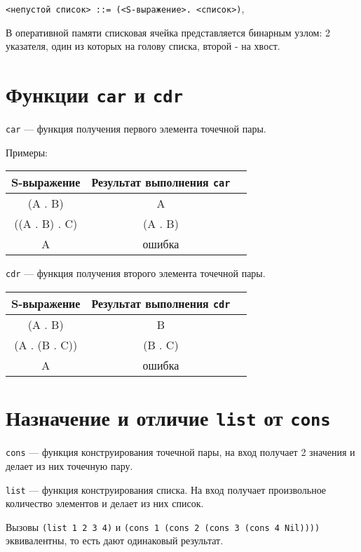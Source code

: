 \texttt{<непустой список> ::= (<S-выражение>. <список>)},

В оперативной памяти списковая ячейка представляется бинарным узлом: 2 указателя, один из которых на голову списка, второй - на хвост.


\section{Функции \texttt{car} и \texttt{cdr}}

\texttt{car} --- функция получения первого элемента точечной пары.

Примеры:

\begin{center}
    \begin{tabular}{ |c|c|c| } 
        \hline
            S-выражение & Результат выполнения \texttt{car} \\ 
        \hline
        \hline
            (A . B) & A \\ 
        \hline
            ((A . B) . C) & (A . B) \\ 
        \hline
            A & ошибка \\ 
        \hline
    \end{tabular}
\end{center}


\texttt{cdr} --- функция получения второго элемента точечной пары.

\begin{center}
    \begin{tabular}{ |c|c|c| } 
        \hline
            S-выражение & Результат выполнения \texttt{cdr} \\ 
        \hline
        \hline
            (A . B) & B \\ 
        \hline
            (A . (B . C)) & (B . C) \\ 
        \hline
            A & ошибка \\ 
        \hline
    \end{tabular}
\end{center}


\section{Назначение и отличие \texttt{list} от \texttt{cons}}

\texttt{cons} --- функция конструирования точечной пары, на вход получает 2 значения и делает из них точечную пару.

\texttt{list} --- функция конструирования списка. На вход получает произвольное количество элементов и делает из них список.

Вызовы \texttt{(list 1 2 3 4)} и \texttt{(cons 1 (cons 2 (cons 3 (cons 4 Nil))))} эквивалентны, то есть дают одинаковый результат.
